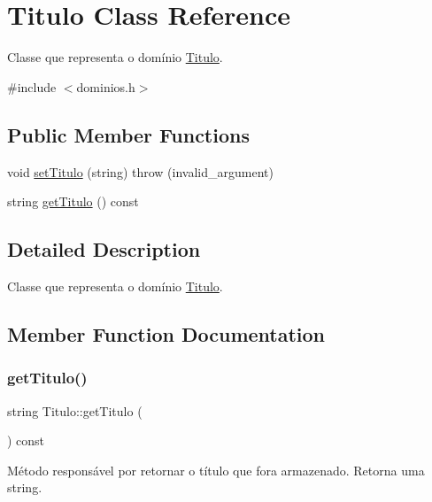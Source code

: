\hypertarget{classTitulo}{}\section{Titulo Class Reference}
\label{classTitulo}


Classe que representa o domínio \hyperlink{classTitulo}{Titulo}.  




{\ttfamily \#include $<$dominios.\+h$>$}

\subsection*{Public Member Functions}
\begin{DoxyCompactItemize}
\item 
void \hyperlink{classTitulo_ac4b3e70d24f498a9085ae9d01d51ef12}{set\+Titulo} (string)  throw (invalid\+\_\+argument)
\item 
string \hyperlink{classTitulo_ad13d7166263fe5b8053532a820165390}{get\+Titulo} () const
\end{DoxyCompactItemize}


\subsection{Detailed Description}
Classe que representa o domínio \hyperlink{classTitulo}{Titulo}. 

\subsection{Member Function Documentation}
\mbox{\label{classTitulo_ad13d7166263fe5b8053532a820165390}} 
\subsubsection{\texorpdfstring{get\+Titulo()}{getTitulo()}}
{\footnotesize\ttfamily string Titulo\+::get\+Titulo (\begin{DoxyParamCaption}{ }\end{DoxyParamCaption}) const\hspace{0.3cm}{\ttfamily [inline]}}

Método responsável por retornar o título que fora armazenado. Retorna uma string. \mbox{\label{classTitulo_ac4b3e70d24f498a9085ae9d01d51ef12}} 
